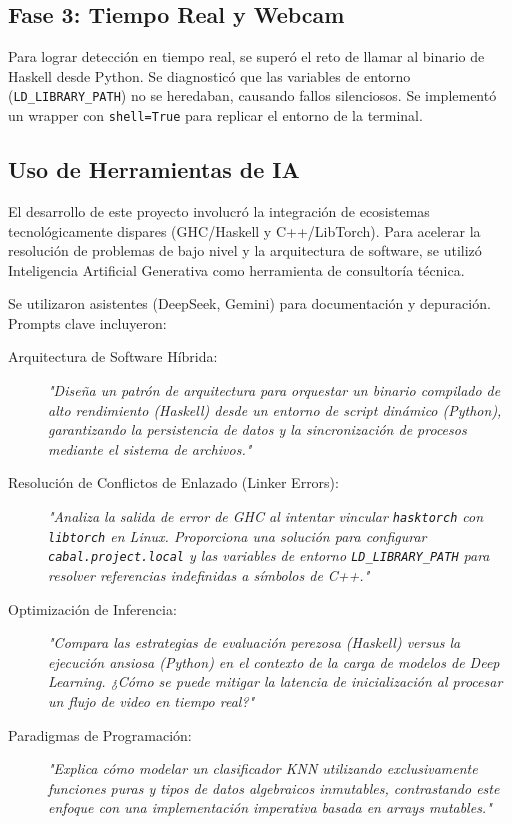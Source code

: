 \documentclass[12pt, letterpaper]{article}
\begin{document}
\subsection{Fase 3: Tiempo Real y Webcam}
Para lograr detección en tiempo real, se superó el reto de llamar al binario de Haskell desde Python. Se diagnosticó que las variables de entorno (\texttt{LD\_LIBRARY\_PATH}) no se heredaban, causando fallos silenciosos. Se implementó un wrapper con \texttt{shell=True} para replicar el entorno de la terminal.

\subsection{Uso de Herramientas de IA}

El desarrollo de este proyecto involucró la integración de ecosistemas tecnológicamente dispares (GHC/Haskell y C++/LibTorch). Para acelerar la resolución de problemas de bajo nivel y la arquitectura de software, se utilizó Inteligencia Artificial Generativa como herramienta de consultoría técnica.

Se utilizaron asistentes (DeepSeek, Gemini) para documentación y depuración. Prompts clave incluyeron:

\begin{description}
    \item[Arquitectura de Software Híbrida:]
    \textit{"Diseña un patrón de arquitectura para orquestar un binario compilado de alto rendimiento (Haskell) desde un entorno de script dinámico (Python), garantizando la persistencia de datos y la sincronización de procesos mediante el sistema de archivos."}
    
    \item[Resolución de Conflictos de Enlazado (Linker Errors):]
    \textit{"Analiza la salida de error de GHC al intentar vincular \texttt{hasktorch} con \texttt{libtorch} en Linux. Proporciona una solución para configurar \texttt{cabal.project.local} y las variables de entorno \texttt{LD\_LIBRARY\_PATH} para resolver referencias indefinidas a símbolos de C++."}
    
    \item[Optimización de Inferencia:]
    \textit{"Compara las estrategias de evaluación perezosa (Haskell) versus la ejecución ansiosa (Python) en el contexto de la carga de modelos de Deep Learning. ¿Cómo se puede mitigar la latencia de inicialización al procesar un flujo de video en tiempo real?"}
    
    \item[Paradigmas de Programación:]
    \textit{"Explica cómo modelar un clasificador KNN utilizando exclusivamente funciones puras y tipos de datos algebraicos inmutables, contrastando este enfoque con una implementación imperativa basada en arrays mutables."}
\end{description}
\end{document}
